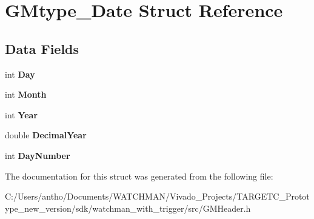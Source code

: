 \section{G\+Mtype\+\_\+\+Date Struct Reference}
\label{struct_g_mtype___date}
\subsection*{Data Fields}
\begin{DoxyCompactItemize}
\item 
\mbox{\label{struct_g_mtype___date_a8f67164de537e3ec2b47e3204ddd3400}} 
int {\bfseries Day}
\item 
\mbox{\label{struct_g_mtype___date_a530b376ec91a278ac98531d3ea17f148}} 
int {\bfseries Month}
\item 
\mbox{\label{struct_g_mtype___date_a42e645110404fbf4f10235789577fa32}} 
int {\bfseries Year}
\item 
\mbox{\label{struct_g_mtype___date_afb8201d541b7b916e28bdf9884f6c794}} 
double {\bfseries Decimal\+Year}
\item 
\mbox{\label{struct_g_mtype___date_a5f6dc4b06442462a807a1069a8c82b6d}} 
int {\bfseries Day\+Number}
\end{DoxyCompactItemize}


The documentation for this struct was generated from the following file\+:\begin{DoxyCompactItemize}
\item 
C\+:/\+Users/antho/\+Documents/\+W\+A\+T\+C\+H\+M\+A\+N/\+Vivado\+\_\+\+Projects/\+T\+A\+R\+G\+E\+T\+C\+\_\+\+Prototype\+\_\+new\+\_\+version/sdk/watchman\+\_\+with\+\_\+trigger/src/G\+M\+Header.\+h\end{DoxyCompactItemize}
